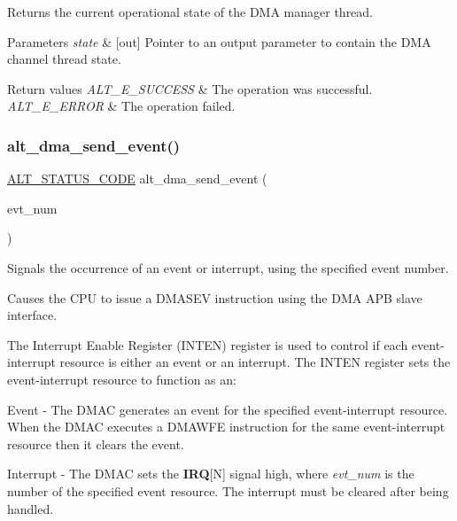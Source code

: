 Returns the current operational state of the D\+MA manager thread.


\begin{DoxyParams}{Parameters}
{\em state} & \mbox{[}out\mbox{]} Pointer to an output parameter to contain the D\+MA channel thread state.\\
\hline
\end{DoxyParams}

\begin{DoxyRetVals}{Return values}
{\em A\+L\+T\+\_\+\+E\+\_\+\+S\+U\+C\+C\+E\+SS} & The operation was successful. \\
\hline
{\em A\+L\+T\+\_\+\+E\+\_\+\+E\+R\+R\+OR} & The operation failed. \\
\hline
\end{DoxyRetVals}
\mbox{\label{group__ALT__DMA__CSR_ga218c0ebb854b175e5b3a549003ebdeb2}} 
\subsubsection{\texorpdfstring{alt\_dma\_send\_event()}{alt\_dma\_send\_event()}}
{\footnotesize\ttfamily \mbox{\hyperlink{hwlib_8h_abdb0d369f069723ca55d6c94bcaaaa12}{A\+L\+T\+\_\+\+S\+T\+A\+T\+U\+S\+\_\+\+C\+O\+DE}} alt\+\_\+dma\+\_\+send\+\_\+event (\begin{DoxyParamCaption}\item[{\mbox{\hyperlink{group__ALT__DMA__COMMON_gad02f1735ad41b201414e8d032e0f9426}{A\+L\+T\+\_\+\+D\+M\+A\+\_\+\+E\+V\+E\+N\+T\+\_\+t}}}]{evt\+\_\+num }\end{DoxyParamCaption})}

Signals the occurrence of an event or interrupt, using the specified event number.

Causes the C\+PU to issue a D\+M\+A\+S\+EV instruction using the D\+MA A\+PB slave interface.

The Interrupt Enable Register (I\+N\+T\+EN) register is used to control if each event-\/interrupt resource is either an event or an interrupt. The I\+N\+T\+EN register sets the event-\/interrupt resource to function as an\+:
\begin{DoxyItemize}
\item Event -\/ The D\+M\+AC generates an event for the specified event-\/interrupt resource. When the D\+M\+AC executes a D\+M\+A\+W\+FE instruction for the same event-\/interrupt resource then it clears the event.
\item Interrupt -\/ The D\+M\+AC sets the {\bfseries{I\+RQ}}\mbox{[}N\mbox{]} signal high, where {\itshape evt\+\_\+num} is the number of the specified event resource. The interrupt must be cleared after being handled.
\end{DoxyItemize}

